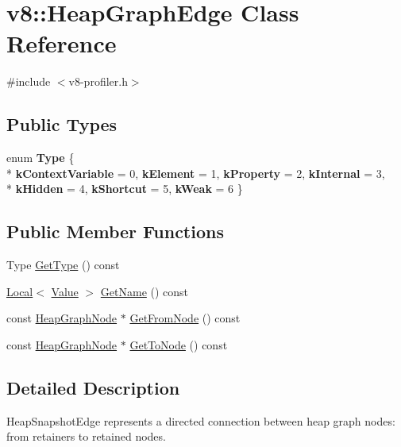 \hypertarget{classv8_1_1HeapGraphEdge}{}\section{v8\+:\+:Heap\+Graph\+Edge Class Reference}
\label{classv8_1_1HeapGraphEdge}


{\ttfamily \#include $<$v8-\/profiler.\+h$>$}

\subsection*{Public Types}
\begin{DoxyCompactItemize}
\item 
\hypertarget{classv8_1_1HeapGraphEdge_a252500cf4307fe9e4fcb0335a907259b}{}enum {\bfseries Type} \{ \\*
{\bfseries k\+Context\+Variable} = 0, 
{\bfseries k\+Element} = 1, 
{\bfseries k\+Property} = 2, 
{\bfseries k\+Internal} = 3, 
\\*
{\bfseries k\+Hidden} = 4, 
{\bfseries k\+Shortcut} = 5, 
{\bfseries k\+Weak} = 6
 \}\label{classv8_1_1HeapGraphEdge_a252500cf4307fe9e4fcb0335a907259b}

\end{DoxyCompactItemize}
\subsection*{Public Member Functions}
\begin{DoxyCompactItemize}
\item 
Type \hyperlink{classv8_1_1HeapGraphEdge_a7f4923098074ee4c47d901f363728d08}{Get\+Type} () const 
\item 
\hyperlink{classv8_1_1Local}{Local}$<$ \hyperlink{classv8_1_1Value}{Value} $>$ \hyperlink{classv8_1_1HeapGraphEdge_a295702dc31ef38dadb54143f2a76e12e}{Get\+Name} () const 
\item 
const \hyperlink{classv8_1_1HeapGraphNode}{Heap\+Graph\+Node} $\ast$ \hyperlink{classv8_1_1HeapGraphEdge_acd43a5082f1862b7c0c0094fc75af631}{Get\+From\+Node} () const 
\item 
const \hyperlink{classv8_1_1HeapGraphNode}{Heap\+Graph\+Node} $\ast$ \hyperlink{classv8_1_1HeapGraphEdge_ad8fd8fa121a0e778a8b120a0c5fa227c}{Get\+To\+Node} () const 
\end{DoxyCompactItemize}


\subsection{Detailed Description}
Heap\+Snapshot\+Edge represents a directed connection between heap graph nodes\+: from retainers to retained nodes. 

